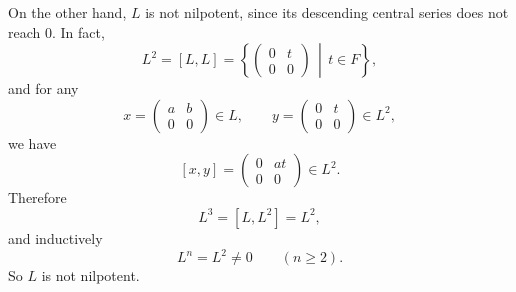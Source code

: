 \begin{example}
    On the other hand, \(L\) is not nilpotent, since its descending central series does not reach \(0\). In fact,
    \[
        L^2=[L,L]
        =
        \left\{
        \begin{pmatrix}
            0 & t \\
            0 & 0
        \end{pmatrix}
        \,\middle|\,
        t\in F
        \right\},
    \]
    and for any
    \[
        x=
        \begin{pmatrix}
            a & b \\
            0 & 0
        \end{pmatrix}\in L,\qquad
        y=
        \begin{pmatrix}
            0 & t \\
            0 & 0
        \end{pmatrix}\in L^2,
    \]
    we have
    \[
        [x,y]
        =
        \begin{pmatrix}
            0 & at \\
            0 & 0
        \end{pmatrix}\in L^2.
    \]
    Therefore
    \[
        L^3=[L,L^2]=L^2,
    \]
    and inductively
    \[
        L^n=L^2\neq 0\qquad (n\ge 2).
    \]
    So \(L\) is not nilpotent.
\end{example}

